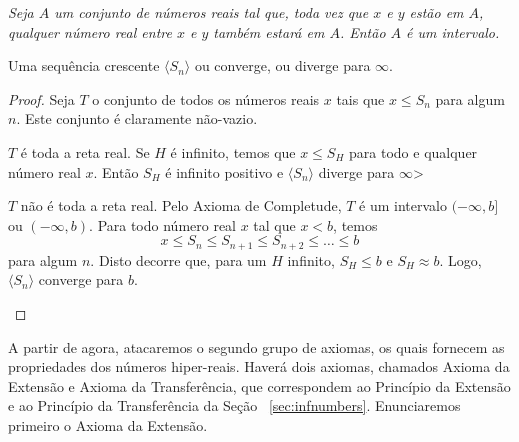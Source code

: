 
\emph{
Seja $A$ um conjunto de números reais tal que, toda vez que $x$ e $y$
estão em $A$, qualquer número real entre $x$ e $y$ também estará em $A$.
Então $A$ é um intervalo.
}

\begin{theor}
Uma sequência crescente $\langle S_n \rangle$ ou converge, ou diverge para
$\infty$.
\end{theor}

\begin{proof}
Seja $T$ o conjunto de todos os números reais $x$ tais que $x \le S_n$ para
algum $n$. Este conjunto é claramente não-vazio.

\begin{case}$T$ é toda a reta real. Se $H$ é infinito, temos que $x \le S_H$
para todo e qualquer número real $x$. Então $S_H$ é infinito positivo e
$\langle S_n \rangle$ diverge para $\infty$>
\end{case}

\begin{case}$T$ não é toda a reta real. Pelo Axioma de Completude,
$T$ é um intervalo $(-\infty,b]$ ou $(-\infty,b)$. Para todo número
real $x$ tal que $x < b$, temos
\[
	x \le S_n \le S_{n+1} \le S_{n+2} \le \ldots \le b
\]
para algum $n$. Disto decorre que, para um $H$ infinito, $S_H \le b$ e
$S_H \approx b$. Logo, $\langle S_n \rangle$ converge para $b$.
\end{case}%
\end{proof}

A partir de agora, atacaremos o segundo grupo de axiomas, os quais
fornecem as propriedades dos números hiper-reais. Haverá dois axiomas,
chamados Axioma da Extensão e Axioma da Transferência, que correspondem
ao Princípio da Extensão e ao Princípio da Transferência da Seção%
~\ref{sec:infnumbers}. Enunciaremos primeiro o Axioma da Extensão.


